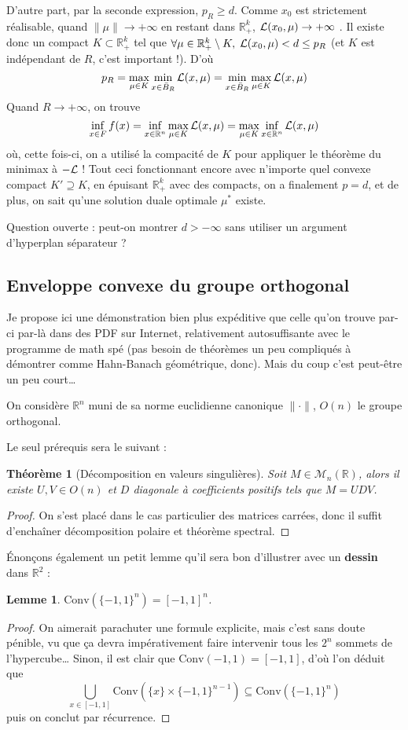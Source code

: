 \documentclass[a4paper, 11pt]{article}
\def\R{\mathbb{R}}
\def\L{{\cal{L}}}
\def\M{\mathcal{M}}
\newtheorem*{theorem}{Théorème}
\newtheorem*{lemma}{Lemme}
\begin{document}
D'autre part, par la seconde expression, $p_R \geq d$. Comme $x_0$ est
strictement réalisable, quand $\|\mu\| \to +\infty$ en restant dans $\R_+^k$,
$\L(x_0, \mu) \to +\infty$ . Il existe donc un compact $K \subset \R_+^k$ tel
que $\forall \mu \in \R_+^k \setminus K,\; \L(x_0, \mu) < d \leq p_R$ (et $K$
est indépendant de $R$, c'est important !). D'où
\[ p_R = \max_{\mu \in K} \min_{x \in \bar{B}_R} \L(x,\mu) =
  \min_{x \in \bar{B}_R} \max_{\mu \in K} \L(x,\mu) \]
Quand $R \to +\infty$, on trouve
\[ \inf_{x \in F} f(x) = \inf_{x \in \R^n} \max_{\mu \in K} \L(x,\mu) 
  = \max_{\mu \in K} \inf_{x \in \R^n} \L(x,\mu)  \]
où, cette fois-ci, on a utilisé la compacité de $K$ pour appliquer le théorème
du minimax à $-\L$ ! Tout ceci fonctionnant encore avec n'importe quel convexe
compact $K' \supseteq K$, en épuisant $\R_+^k$ avec des compacts, on a
finalement $p = d$, et de plus, on sait qu'une solution duale optimale $\mu^*$
existe.

Question ouverte : peut-on montrer $d > -\infty$ sans utiliser un argument
d'hyperplan séparateur ?


\newpage

\subsection{Enveloppe convexe du groupe orthogonal}
\label{conv-ortho}

Je propose ici une démonstration bien plus expéditive que celle qu'on trouve
par-ci par-là dans des PDF sur Internet, relativement autosuffisante avec le
programme de math spé (pas besoin de théorèmes un peu compliqués à démontrer
comme Hahn-Banach géométrique, donc). Mais du coup c'est peut-être un peu court…

On considère $\R^n$ muni de sa norme euclidienne canonique $\|\cdot\|$, $O(n)$
le groupe orthogonal.

Le seul prérequis sera le suivant :

\begin{theorem}[Décomposition en valeurs singulières]
  Soit $M \in \M_n(\R)$, alors il existe $U, V \in O(n)$ et $D$ diagonale à
  coefficients positifs tels que $M = UDV$.
\end{theorem}
\begin{proof}
  On s'est placé dans le cas particulier des matrices carrées, donc il suffit
  d'enchaîner décomposition polaire et théorème spectral.
\end{proof}

Énonçons également un petit lemme qu'il sera bon d'illustrer avec un
\textbf{dessin} dans $\R^2$ :
\begin{lemma}
  $\mathrm{Conv}(\{-1,1\}^n) = [-1,1]^n$.
\end{lemma}
\begin{proof}
  On aimerait parachuter une formule explicite, mais c'est sans doute pénible,
  vu que ça devra impérativement faire intervenir tous les $2^n$ sommets de
  l'hypercube… Sinon, il est clair que $\mathrm{Conv}({-1,1}) = [-1,1]$, d'où
  l'on déduit que
  \[ \bigcup_{x \in [-1,1]}
  \mathrm{Conv}(\{x\} \times \{-1,1\}^{n-1}) \subseteq
  \mathrm{Conv}(\{-1,1\}^n) \]
  puis on conclut par récurrence.
\end{proof}
\end{document}
